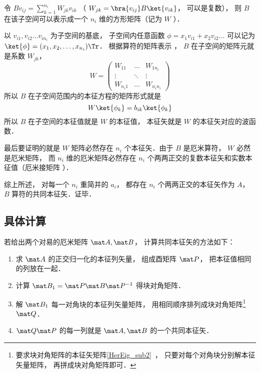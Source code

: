 令 $B v_{ij} = \sum_{k=1}^{n_i} W_{jk}v_{ik}$ （ $W_{jk} = \bra{v_{ij}} B \ket{v_{ik}}$， 可以是复数）， 则 $B$ 在该子空间可以表示成一个 $n_i$ 维的方形矩阵（记为 $W$ ）．

以 $v_{i1}, v_{i2} \dots v_{i n_i}$ 为子空间的基底， 子空间内任意函数 $\phi  = x_1 v_{i1} + x_2 v_{i2}\dots$ 可以记为 $\ket{\phi} = (x_1, x_2, \dots, x_{n_i})\Tr$． 根据算符的矩阵表示
， $B$ 在子空间的矩阵元就是系数 $W_{jk}$， 
\begin{equation}
W = \begin{pmatrix}
W_{11} & \ldots & W_{1 n_i}\\
\vdots & \ddots & \vdots \\
W_{n_i 1} & \ldots & W_{n_i n_i}
\end{pmatrix}
\end{equation}
所以 $B$ 在子空间范围内的本征方程的矩阵形式就是
\begin{equation}
W \ket{\phi_k} = b_{ik} \ket{\phi_k}
\end{equation}
所以 $B$ 在子空间的本征值就是 $W$ 的本征值， 本征矢就是 $W$ 的本征矢对应的波函数．

最后要证明的就是 $W$ 矩阵必然存在 $n_i$ 个本征矢．由于 $B$ 是厄米算符，  $W$ 必然是厄米矩阵， 而 $n_i$ 维的厄米矩阵必然存在 $n_i$ 个两两正交的复数本征矢和实数本征值（厄米接矩阵%
）．

综上所述， 对每一个 $n_i$ 重简并的 $a_i$，  都存在 $n_i$ 个两两正交的本征矢作为 $A$，  $B$ 算符的共同本征矢．证毕．

\subsection{具体计算}
若给出两个对易的厄米矩阵 $\mat A, \mat B$， 计算共同本征矢的方法如下：
\begin{enumerate}
\item 求 $\mat A$ 的正交归一化的本征列矢量， 组成酉矩阵 $\mat P$， 把本征值相同的列放在一起．
\item 计算 $\mat B_1 = \mat P \mat B\mat P^{-1}$ 得块对角矩阵．
\item 解 $\mat B_1$ 每一对角块的本征列矢量矩阵， 用相同顺序排列成块对角矩阵\footnote{要求块对角矩阵的本征矢矩阵\autoref{HerEig_sub2}~， 只要对每个对角块分别解本征矢量矩阵， 再拼成块对角矩阵即可．} $\mat Q$．
\item $\mat Q\mat P$ 的每一列就是 $\mat A, \mat B$ 的一个共同本征矢．
\end{enumerate}

